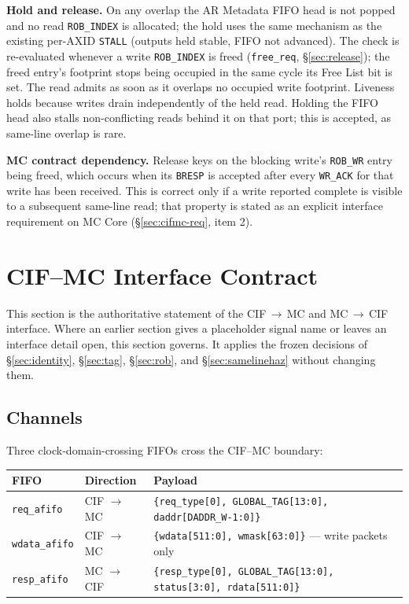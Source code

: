 \textbf{Hold and release.} On any overlap the AR Metadata FIFO head is not
popped and no read \texttt{ROB\_INDEX} is allocated; the hold uses the same
mechanism as the existing per-AXID \texttt{STALL} (outputs held stable, FIFO
not advanced).  The check is re-evaluated whenever a write
\texttt{ROB\_INDEX} is freed (\texttt{free\_req}, \S\ref{sec:release}); the
freed entry's footprint stops being occupied in the same cycle its Free List
bit is set.  The read admits as soon as it overlaps no occupied write
footprint.  Liveness holds because writes drain independently of the held
read.  Holding the FIFO head also stalls non-conflicting reads behind it on
that port; this is accepted, as same-line overlap is rare.

\textbf{MC contract dependency.} Release keys on the blocking write's
\texttt{ROB\_WR} entry being freed, which occurs when its \texttt{BRESP} is
accepted after every \texttt{WR\_ACK} for that write has been received.  This
is correct only if a write reported complete is visible to a subsequent
same-line read; that property is stated as an explicit interface requirement
on MC Core (\S\ref{sec:cifmc-req}, item 2).

\section{CIF--MC Interface Contract}
\label{sec:cifmc}
\label{sec:pktformat}

This section is the authoritative statement of the CIF\,$\to$\,MC and
MC\,$\to$\,CIF interface.  Where an earlier section gives a placeholder
signal name or leaves an interface detail open, this section governs.  It
applies the frozen decisions of \S\ref{sec:identity}, \S\ref{sec:tag},
\S\ref{sec:rob}, and \S\ref{sec:samelinehaz} without changing them.

\subsection{Channels}

Three clock-domain-crossing FIFOs cross the CIF--MC boundary:

\begin{center}
\begin{tabular}{lll}
\toprule
\textbf{FIFO} & \textbf{Direction} & \textbf{Payload}\\
\midrule
\texttt{req\_afifo}   & CIF $\to$ MC & \texttt{\{req\_type[0], GLOBAL\_TAG[13:0], daddr[DADDR\_W-1:0]\}}\\
\texttt{wdata\_afifo} & CIF $\to$ MC & \texttt{\{wdata[511:0], wmask[63:0]\}} --- write packets only\\
\texttt{resp\_afifo}  & MC $\to$ CIF & \texttt{\{resp\_type[0], GLOBAL\_TAG[13:0], status[3:0], rdata[511:0]\}}\\
\bottomrule
\end{tabular}
\end{center}

